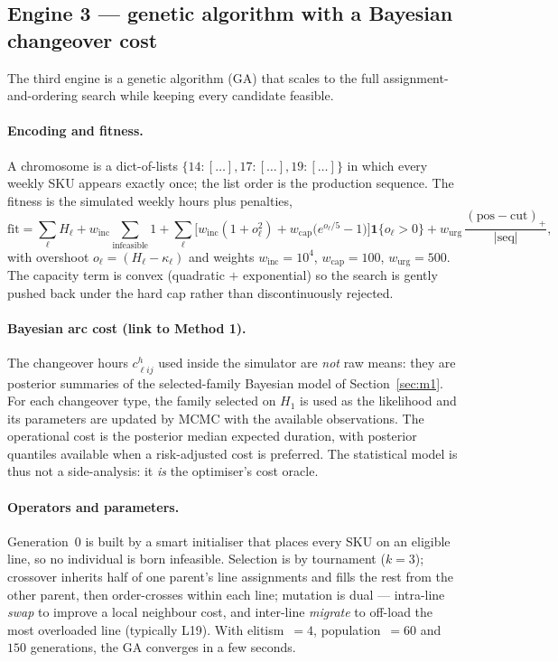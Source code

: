 \documentclass[11pt,a4paper]{article}
\begin{document}
\subsection{Engine 3 --- genetic algorithm with a Bayesian changeover cost}
The third engine is a genetic algorithm (GA) \cite{holland1992ga} that scales to
the full assignment-and-ordering search while keeping every candidate feasible.

\paragraph{Encoding and fitness.}
A chromosome is a dict-of-lists $\{14:[\dots],17:[\dots],19:[\dots]\}$ in which
every weekly SKU appears exactly once; the list order is the production sequence.
The fitness is the simulated weekly hours plus penalties,
\begin{equation}
\text{fit} = \sum_\ell H_\ell
 + w_{\text{inc}}\!\!\sum_{\text{infeasible}}\!\!1
 + \sum_\ell\Big[w_{\text{inc}}(1+o_\ell^2)+w_{\text{cap}}\big(e^{o_\ell/5}-1\big)\Big]\mathbf{1}\{o_\ell>0\}
 + w_{\text{urg}}\,\frac{(\text{pos}-\text{cut})_+}{|\text{seq}|},
\label{eq:fitness}
\end{equation}
with overshoot $o_\ell=(H_\ell-\kappa_\ell)$ and weights
$w_{\text{inc}}=10^4$, $w_{\text{cap}}=100$, $w_{\text{urg}}=500$. The capacity
term is convex (quadratic $+$ exponential) so the search is gently pushed back
under the hard cap rather than discontinuously rejected.

\paragraph{Bayesian arc cost (link to Method 1).}
The changeover hours $c^h_{\ell ij}$ used inside the simulator are \emph{not} raw
means: they are posterior summaries of the selected-family Bayesian model of
Section~\ref{sec:m1}. For each changeover type, the family selected on $H_1$ is
used as the likelihood and its parameters are updated by MCMC with the available
observations. The operational cost is the posterior median expected duration,
with posterior quantiles available when a risk-adjusted cost is preferred. The
statistical model is thus not a side-analysis: it \emph{is} the optimiser's cost
oracle.

\paragraph{Operators and parameters.}
Generation~0 is built by a smart initialiser that places every SKU on an eligible
line, so no individual is born infeasible. Selection is by tournament ($k=3$);
crossover inherits half of one parent's line assignments and fills the rest from
the other parent, then order-crosses within each line; mutation is dual ---
intra-line \emph{swap} to improve a local neighbour cost, and inter-line
\emph{migrate} to off-load the most overloaded line (typically L19). With
elitism~$=4$, population~$=60$ and $150$ generations, the GA converges in a few
seconds.
\end{document}
